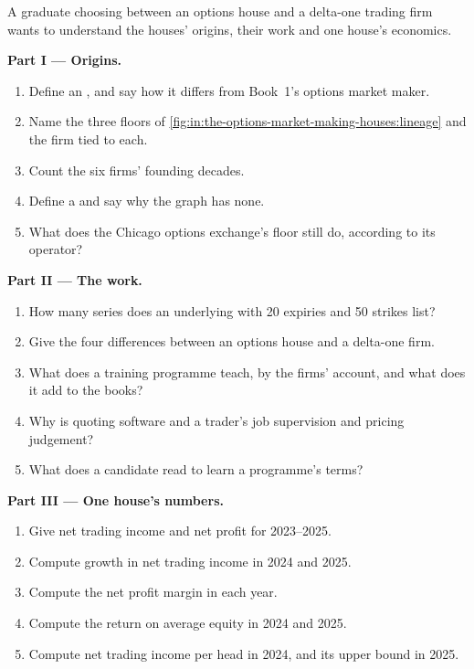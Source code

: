 \begin{problem}\label{pb:in:the-options-market-making-houses:1}
A graduate choosing between an options house and a delta-one trading firm wants to understand the houses' origins,
their work and one house's economics.

\medskip\noindent\textbf{Part I --- Origins.}
\begin{enumerate}
\item Define an , and say how it differs from Book~1's options market maker.
\item Name the three floors of \cref{fig:in:the-options-market-making-houses:lineage} and the firm tied to each.
\item Count the six firms' founding decades.
\item Define a  and say why the graph has none.
\item What does the Chicago options exchange's floor still do, according to its operator?
\end{enumerate}

\medskip\noindent\textbf{Part II --- The work.}
\begin{enumerate}[resume]
\item How many series does an underlying with 20 expiries and 50 strikes list?
\item Give the four differences between an options house and a delta-one firm.
\item What does a training programme teach, by the firms' account, and what does it add to the books?
\item Why is quoting software and a trader's job supervision and pricing judgement?
\item What does a candidate read to learn a programme's terms?
\end{enumerate}

\medskip\noindent\textbf{Part III --- One house's numbers.}
\begin{enumerate}[resume]
\item Give net trading income and net profit for 2023--2025.
\item Compute growth in net trading income in 2024 and 2025.
\item Compute the net profit margin in each year.
\item Compute the return on average equity in 2024 and 2025.
\item Compute net trading income per head in 2024, and its upper bound in 2025.
\end{enumerate}


\end{problem}
